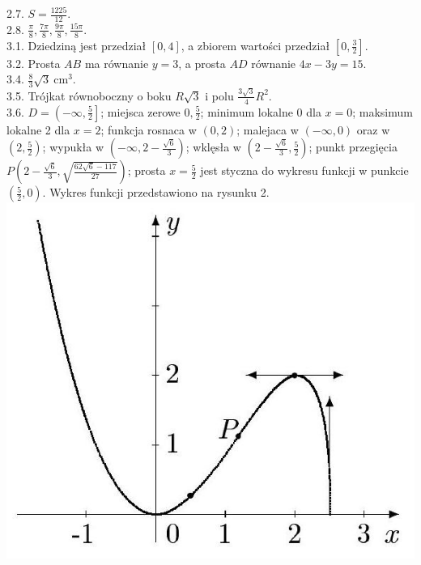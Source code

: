 \documentclass[10pt]{article}
\begin{document}
2.7. $S=\frac{1225}{12}$.\\
2.8. $\frac{\pi}{8}, \frac{7 \pi}{8}, \frac{9 \pi}{8}, \frac{15 \pi}{8}$.\\
3.1. Dziedziną jest przedział $[0,4]$, a zbiorem wartości przedział $\left[0, \frac{3}{2}\right]$.\\
3.2. Prosta $A B$ ma równanie $y=3$, a prosta $A D$ równanie $4 x-3 y=15$.\\
3.4. $\frac{8}{3} \sqrt{3} \mathrm{~cm}^{3}$.\\
3.5. Trójkat równoboczny o boku $R \sqrt{3}$ i polu $\frac{3 \sqrt{3}}{4} R^{2}$.\\
3.6. $D=\left(-\infty, \frac{5}{2}\right]$; miejsca zerowe $0, \frac{5}{2}$; minimum lokalne 0 dla $x=0$; maksimum lokalne 2 dla $x=2$; funkcja rosnaca w $(0,2)$; malejaca w $(-\infty, 0)$ oraz w $\left(2, \frac{5}{2}\right)$; wypukła w $\left(-\infty, 2-\frac{\sqrt{6}}{3}\right)$; wklęsła w $\left(2-\frac{\sqrt{6}}{3}, \frac{5}{2}\right)$; punkt przegięcia $P\left(2-\frac{\sqrt{6}}{3}, \sqrt{\frac{62 \sqrt{6}-117}{27}}\right)$; prosta $x=\frac{5}{2}$ jest styczna do wykresu funkcji w punkcie $\left(\frac{5}{2}, 0\right)$. Wykres funkcji przedstawiono na rysunku 2.\\
\includegraphics[max width=\textwidth, center]{2024_11_16_fe5b564401bf7db98894g-054}
\end{document}
